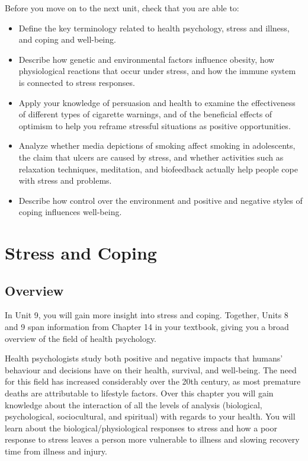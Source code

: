 \documentclass[
]{book}
\begin{document}
\begin{progress}
Before you move on to the next unit, check that you are able to:

\begin{itemize}
\item
  Define the key terminology related to health psychology, stress and illness, and coping and well-being.
\item
  Describe how genetic and environmental factors influence obesity, how physiological reactions that occur under stress, and how the immune system is connected to stress responses.
\item
  Apply your knowledge of persuasion and health to examine the effectiveness of different types of cigarette warnings, and of the beneficial effects of optimism to help you reframe stressful situations as positive opportunities.
\item
  Analyze whether media depictions of smoking affect smoking in adolescents, the claim that ulcers are caused by stress, and whether activities such as relaxation techniques, meditation, and biofeedback actually help people cope with stress and problems.
\item
  Describe how control over the environment and positive and negative styles of coping influences well-being.
\end{itemize}
\end{progress}

\hypertarget{stress-and-coping}{%
\chapter{Stress and Coping}\label{stress-and-coping}}

\hypertarget{overview-8}{%
\section*{Overview}\label{overview-8}}

In Unit 9, you will gain more insight into stress and coping. Together, Units 8 and 9 span information from Chapter 14 in your textbook, giving you a broad overview of the field of health psychology.

Health psychologists study both positive and negative impacts that humans' behaviour and decisions have on their health, survival, and well-being. The need for this field has increased considerably over the 20th century, as most premature deaths are attributable to lifestyle factors. Over this chapter you will gain knowledge about the interaction of all the levels of analysis (biological, psychological, sociocultural, and spiritual) with regards to your health. You will learn about the biological/physiological responses to stress and how a poor response to stress leaves a person more vulnerable to illness and slowing recovery time from illness and injury.
\end{document}
